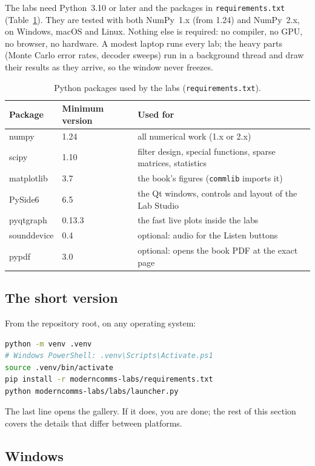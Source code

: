 The labs need Python~3.10 or later and the packages in \texttt{requirements.txt}
(Table~\ref{tab:appB:reqs}). They are tested with both NumPy~1.x (from 1.24) and NumPy~2.x, on
Windows, macOS and Linux. Nothing else is required: no compiler, no GPU, no browser, no hardware. A
modest laptop runs every lab; the heavy parts (Monte Carlo error rates, decoder sweeps) run in a
background thread and draw their results as they arrive, so the window never freezes.

\begin{table}[htbp]\centering\small
\caption{Python packages used by the labs (\texttt{requirements.txt}).}\label{tab:appB:reqs}
\begin{tabular}{@{}lll@{}}
\toprule
Package & Minimum version & Used for\\
\midrule
numpy & 1.24 & all numerical work (1.x or 2.x)\\
scipy & 1.10 & filter design, special functions, sparse matrices, statistics\\
matplotlib & 3.7 & the book's figures (\texttt{commlib} imports it)\\
PySide6 & 6.5 & the Qt windows, controls and layout of the Lab Studio\\
pyqtgraph & 0.13.3 & the fast live plots inside the labs\\
\midrule
sounddevice & 0.4 & optional: audio for the \textsf{Listen} buttons\\
pypdf & 3.0 & optional: opens the book PDF at the exact page\\
\bottomrule
\end{tabular}
\end{table}

\subsection{The short version}

From the repository root, on any operating system:
\begin{lstlisting}[language=bash]
python -m venv .venv
# Windows PowerShell: .venv\Scripts\Activate.ps1
source .venv/bin/activate
pip install -r moderncomms-labs/requirements.txt
python moderncomms-labs/labs/launcher.py
\end{lstlisting}
The last line opens the gallery. If it does, you are done; the rest of this section covers the
details that differ between platforms.

\subsection{Windows}

